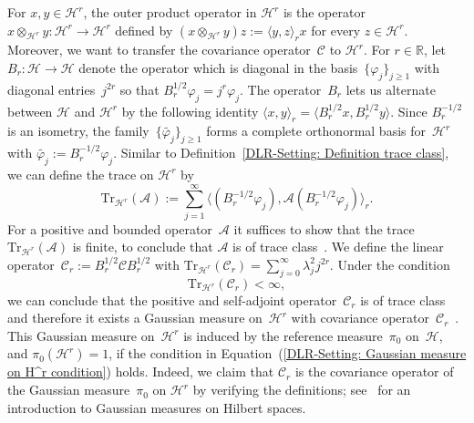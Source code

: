 For $x,y \in \mathcal{H}^r$, the outer product operator in $\mathcal{H}^r$ is the operator~$ x \otimes_{\mathcal{H}^r} y : \mathcal{H}^r \to \mathcal{H}^r $ defined by $ (x \otimes_{\mathcal{H}^r} y) z := \langle y, z \rangle_r x $ for every $ z \in \mathcal{H}^r$. Moreover, we want to transfer the covariance operator~$\mathcal{C}$ to $\mathcal{H}^r$. For $r \in \mathbb{R}$, let $B_r: \mathcal{H} \to \mathcal{H}$ denote the operator which is diagonal in the basis~$\{ \varphi_j \}_{j \geq 1}$ with diagonal entries~$j^{2r}$ so that $B_r^{1/2} \varphi_j = j^{r} \varphi_j$. The operator~$B_r$ lets us alternate between $\mathcal{H}$ and $\mathcal{H}^r$ by the following identity $ \langle x, y \rangle_r = \langle B_r^{1/2} x, B_r^{1/2} y \rangle$. Since $B_r^{-1/2} $ is an isometry, the family~$\{ \tilde{ \varphi_j} \}_{j \geq 1}$ forms a complete orthonormal basis for~$\mathcal{H}^r$ with $ \tilde{ \varphi_j} := B_r^{-1/2} \varphi_j$. Similar to Definition~\ref{DLR-Setting: Definition trace class}, we can define the trace on $\mathcal{H}^r$ by
\begin{equation}
 \label{DLR-Setting: Trace on H^s}
 \text{Tr}_{\mathcal{H}^r}(\mathcal{A}) := \sum_{j=1}^{\infty} \langle (B_r^{-1/2}\varphi_j ), \mathcal{A}( B_r^{-1/2}\varphi_j) \rangle_r.
\end{equation}
For a positive and bounded operator~$\mathcal{A}$ it suffices to show that the trace~$\text{Tr}_{\mathcal{H}^r}(\mathcal{A})$ is finite, to conclude that $\mathcal{A}$ is of trace class~\autocite[Proposition C.3]{DaPrato1992}. We define the linear operator~$\mathcal{C}_r := B_r^{1/2} \mathcal{C} B_r^{1/2} $ with $ \text{Tr}_{\mathcal{H}^r}(\mathcal{C}_r) = \sum_{j=0}^{\infty} \lambda_j^2 j^{2r}$. Under the condition
\begin{equation}
\label{DLR-Setting: Gaussian measure on H^r condition}
 \text{Tr}_{\mathcal{H}^r}(\mathcal{C}_r) < \infty,
\end{equation}
we can conclude that the positive and self-adjoint operator~$\mathcal{C}_r$ is of trace class and therefore it exists a Gaussian measure on~$\mathcal{H}^r$ with covariance operator~$\mathcal{C}_r$~\autocite[Proposition 2.18]{DaPrato1992}. This Gaussian measure on~$\mathcal{H}^r$ is induced by the reference measure~$\pi_0$ on~$\mathcal{H}$, and $ \pi_0(\mathcal{H}^r ) =1$, if the condition in Equation~(\ref{DLR-Setting: Gaussian measure on H^r condition}) holds. Indeed, we claim that $\mathcal{C}_r$ is the covariance operator of the Gaussian measure~$\pi_0$ on $\mathcal{H}^r$ by verifying the definitions; see~\autocite[Chapter 2.3]{DaPrato1992} for an introduction to Gaussian measures on Hilbert spaces.

